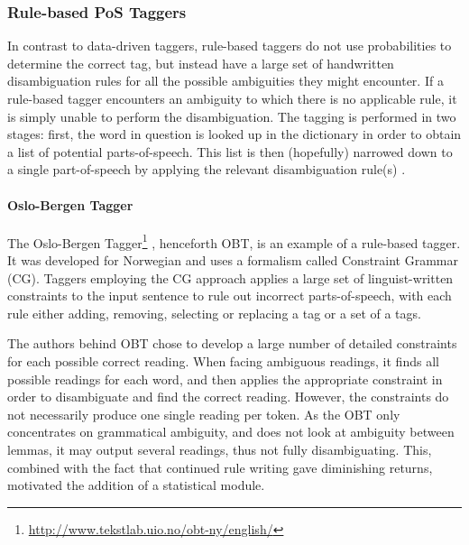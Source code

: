 \documentclass[a4paper,12pt,english]{book}
\begin{document}
\subsubsection{Rule-based PoS Taggers}
\label{sssec:rulebased}
In contrast to data-driven taggers, rule-based taggers do not use
probabilities to determine the correct tag, but instead have a large set of
handwritten disambiguation rules for all the possible ambiguities they might
encounter. If a rule-based tagger encounters an ambiguity to which there is no
applicable rule, it is simply unable to perform the disambiguation. The tagging
is performed in two stages: first, the word in question is looked up in the
dictionary in order to obtain a list of potential parts-of-speech. This list is
then (hopefully) narrowed down to a single part-of-speech by applying the
relevant disambiguation rule(s) \cite[pp.~170--172]{Jur:Mar:09}.

\paragraph{Oslo-Bergen Tagger}
\label{OBT}
The Oslo-Bergen
Tagger\footnote{\url{http://www.tekstlab.uio.no/obt-ny/english/}}
\cite{Hag:Joh:Nok:00}, henceforth OBT, is an example of a rule-based tagger. It
was developed for Norwegian and uses a formalism called Constraint Grammar
(CG). Taggers employing the CG approach applies a large set of linguist-written
constraints to the input sentence to rule out incorrect parts-of-speech, with
each rule either adding, removing, selecting or replacing a tag or a set of a
tags.

The authors behind OBT chose to develop a large number of detailed
constraints for each possible correct reading. When facing ambiguous readings,
it finds all possible readings for each word, and then applies the appropriate
constraint in order to disambiguate and find the correct reading. However, the
constraints do not necessarily produce one single reading per token. As the OBT
only concentrates on grammatical ambiguity, and does not look at ambiguity
between lemmas, it may output several readings, thus not fully
disambiguating. This, combined with the fact that continued rule writing gave
diminishing returns, motivated the addition of a statistical module.
\end{document}
